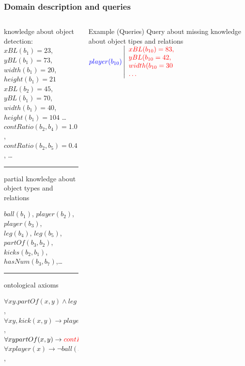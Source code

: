 \documentclass[xcolor=pdftex,dvipsnames,table]{beamer}
\def\imp{\rightarrow}
\begin{document}
\begin{frame}\footnotesize
  \frametitle{Domain description and queries}
  \begin{columns}
  \begin{column}[t]{.47\textwidth}
  \begin{example}
    knowledge about object detection:  \\
    {\color{red}
  $xBL(b_1) = 23$, $yBL(b_1) = 73$, \\
  $width(b_1)=20$, $height(b_1)=21$ \\
  $xBL(b_2) = 45$, $yBL(b_1) = 70$, \\
  $width(b_1)=40$, $height(b_1)=104$ \dots \\
  $contRatio(b_2,b_4)=1.0$,
  $contRatio(b_2,b_5)=0.4$, \dots  \\  }
  \pause

  \hrule 
   partial knowledge about object types and relations 

    {\color{blue} $ball(b_1)$,  $player(b_2)$, $player(b_3)$, \\
    $leg(b_4)$, $leg(b_5)$, $partOf(b_3,b_2)$, \\
    $kicks(b_2,b_1)$, $hasNum(b_3,b_7)$,\dots \\
    \pause}

  \hrule 
    ontological axioms 
 \color{blue}

 $\forall xy. partOf(x,y)\wedge leg(x)\imp player(y)$, \\
 $\forall xy, kick(x,y)\imp player(x)\wedge ball(y)$, \\
 $\forall xy partOf(x,y)\imp{\color{red} contRatio(x,y) > .9}$\\
 $\forall x player(x) \imp \neg ball(x)$, \\ 
  \end{example}
\end{column}
\pause
\begin{column}[t]{.5\textwidth}
  \begin{block}{Example (Queries)}
    Query about missing knowledge about object tipes and relations
    ${\color{blue} player(b_{10})}
      \left|
        \color{red}
        \begin{array}{l}
          xBL(b_{10}) = 83,\\ yBL(b_{10} = 42, \\
          width(b_{10}=30 \\ \dots
        \end{array}\right.
      $
      

\end{block}
\end{column}
\end{columns}
\end{frame}
\end{document}
